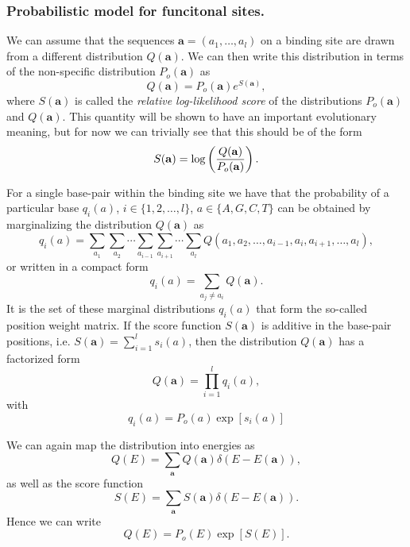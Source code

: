 \subsubsection{Probabilistic model for funcitonal sites.}

We can assume that the sequences $\mathbf{a} = (a_1, \ldots, a_l)$ on a binding
site are drawn from a different distribution $Q(\mathbf{a})$. We can then write
this distribution in terms of the non-specific distribution $P_o(\mathbf{a})$ as
\begin{equation}
  Q(\mathbf{a}) = P_o(\mathbf{a}) e^{S(\mathbf{a})},
\end{equation}
where $S(\mathbf{a})$ is called the {\it relative log-likelihood score} of the
distributions $P_o(\mathbf{a})$ and $Q(\mathbf{a})$. This quantity will be shown
to have an important evolutionary meaning, but for now we can trivially see that
this should be of the form
\begin{equation}
  S(\mathbf{a}) = \log \left( {Q(\mathbf{a}) \over P_o(\mathbf{a})} \right).
\end{equation}

For a single base-pair within the binding site we have that the probability of
a particular base $q_i(a)$, $i \in \{1, 2, \ldots, l\}$, $a \in \{A, G, C, T \}$
can be obtained by marginalizing the distribution $Q(\mathbf{a})$ as
\begin{equation}
  q_i(a) = \sum_{a_1} \sum_{a_2} \cdots \sum_{a_{i-1}}\sum_{a_{i+1}}
  \cdots \sum_{a_l} Q(a_1, a_2, \ldots, a_{i-1}, a_{i}, a_{i+1}, \ldots, a_l),
\end{equation}
or written in a compact form
\begin{equation}
  q_i(a) = \sum_{a_j \neq a_i} Q(\mathbf{a}).
\end{equation}
It is the set of these marginal distributions $q_i(a)$ that form the so-called
position weight matrix. If the score function $S(\mathbf{a})$ is additive in the
base-pair positions, i.e. $S(\mathbf{a}) = \sum_{i=1}^l s_i(a)$, then the
distribution $Q(\mathbf{a})$ has a factorized form
\begin{equation}
  Q(\mathbf{a}) = \prod_{i=1}^l q_i(a),
\end{equation}
with
\begin{equation}
  q_i(a) = P_o(a)\exp\left[ s_i(a) \right]
\end{equation}

We can again map the distribution into energies as
\begin{equation}
  Q(E) = \sum_{\mathbf{a}} Q(\mathbf{a}) \delta (E - E(\mathbf{a})),
\end{equation}
as well as the score function
\begin{equation}
  S(E) = \sum_{\mathbf{a}} S(\mathbf{a}) \delta (E - E(\mathbf{a})).
\end{equation}
Hence we can write
\begin{equation}
  Q(E) = P_o(E)\exp\left[ S(E) \right].
\end{equation}

